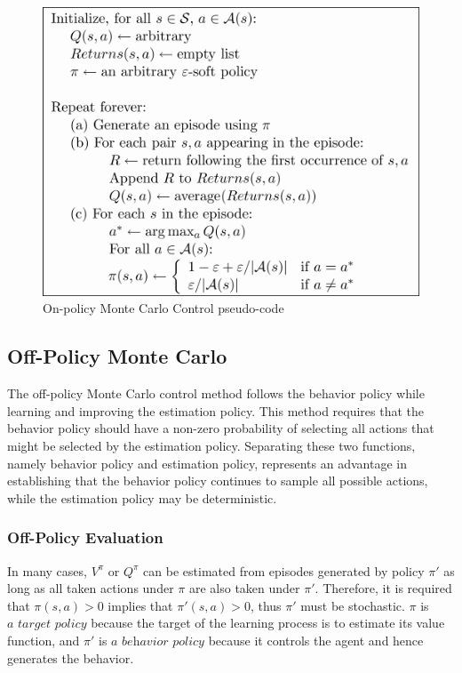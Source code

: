 \documentclass[paper=a4, fontsize=11pt]{scrartcl}
\numberwithin{equation}{section}		%
\numberwithin{figure}{section}			%
\numberwithin{table}{section}				%
\begin{document}
\begin{figure}[ht] \centering
\includegraphics[scale=0.6]{pseudotmp5.pdf}
\caption{On-policy Monte Carlo Control pseudo-code} \label{onmc}
\end{figure}

\subsection{\textbf {Off-Policy Monte Carlo}}
The off-policy Monte Carlo control method follows the behavior policy while learning and improving the estimation policy. This method requires that the behavior policy should have a non-zero probability of selecting all actions that might be selected by the estimation policy. Separating these two functions, namely behavior policy and estimation policy, represents an advantage in establishing that the behavior policy continues to sample all possible actions, while the estimation policy may be deterministic.

\subsubsection*{Off-Policy Evaluation}
In many cases, $V^\pi$ or $Q^\pi$ can be estimated from episodes generated by policy $\pi'$ as long as all taken actions under $\pi$ are also taken under $\pi'$. Therefore, it is required that $\pi(s,a)>0$ implies that $\pi'(s,a)>0$, thus $\pi'$ must be stochastic. $\pi$ is $\textit{a target policy}$ because the target of the learning process is to estimate its value function, and $\pi'$ is $\textit{a behavior policy}$ because it controls the agent and hence generates the behavior.
\end{document}
